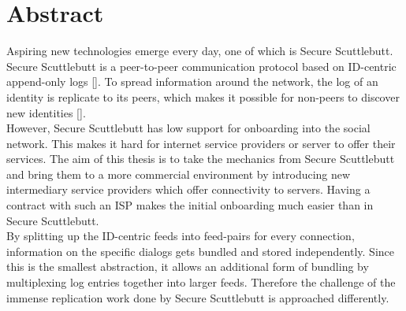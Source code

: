 \chapter{Abstract}
Aspiring new technologies emerge every day, one of which is Secure Scuttlebutt. Secure Scuttlebutt is a peer-to-peer communication protocol based on ID-centric append-only logs []. To spread information around the network, the log of an identity is replicate to its peers, which makes it possible for non-peers to discover new identities [].
\\

However, Secure Scuttlebutt has low support for onboarding into the social network. This makes it hard for internet service providers or server to offer their services. The aim of this thesis is to take the mechanics from Secure Scuttlebutt and bring them to a more commercial environment by introducing new intermediary service providers which offer connectivity to servers. Having a contract with such an ISP makes the initial onboarding much easier than in Secure Scuttlebutt. 
\\

By splitting up the ID-centric feeds into feed-pairs for every connection, information on the specific dialogs gets bundled and stored independently. Since this is the smallest abstraction, it allows an additional form of bundling by multiplexing log entries together into larger feeds. Therefore the challenge of the immense replication work done by Secure Scuttlebutt is approached differently. 
